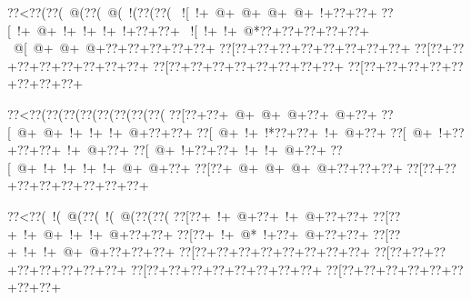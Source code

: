 \vbox{\vbox{\goo
\hbox{\0??<\0??(\0??(\- @(\0??(\- @(\- !(\0??(\0??(}
\hbox{\- ![\- !+\- @+\- @+\- @+\- @+\- !+\0??+\0??+}
\hbox{\0??[\- !+\- @+\- !+\- !+\- !+\- !+\0??+\0??+}
\hbox{\- ![\- !+\- !+\- @*\0??+\0??+\0??+\0??+\0??+}
\hbox{\- @[\- @+\- @+\- @+\0??+\0??+\0??+\0??+\0??+}
\hbox{\0??[\0??+\0??+\0??+\0??+\0??+\0??+\0??+\0??+}
\hbox{\0??[\0??+\0??+\0??+\0??+\0??+\0??+\0??+\0??+}
\hbox{\0??[\0??+\0??+\0??+\0??+\0??+\0??+\0??+\0??+}
\hbox{\0??[\0??+\0??+\0??+\0??+\0??+\0??+\0??+\0??+}
\smallskip
}
}
\hfil\break


\vbox{\vbox{\goo
\hbox{\0??<\0??(\0??(\0??(\0??(\0??(\0??(\0??(\0??(}
\hbox{\0??[\0??+\0??+\- @+\- @+\- @+\0??+\- @+\0??+}
\hbox{\0??[\- @+\- @+\- !+\- !+\- !+\- @+\0??+\0??+}
\hbox{\0??[\- @+\- !+\- !*\0??+\0??+\- !+\- @+\0??+}
\hbox{\0??[\- @+\- !+\0??+\0??+\0??+\- !+\- @+\0??+}
\hbox{\0??[\- @+\- !+\0??+\0??+\- !+\- !+\- @+\0??+}
\hbox{\0??[\- @+\- !+\- !+\- !+\- !+\- @+\- @+\0??+}
\hbox{\0??[\0??+\- @+\- @+\- @+\- @+\0??+\0??+\0??+}
\hbox{\0??[\0??+\0??+\0??+\0??+\0??+\0??+\0??+\0??+}
\smallskip
}
}
\hfil\break


\vbox{\vbox{\goo
\hbox{\0??<\0??(\- !(\- @(\0??(\- !(\- @(\0??(\0??(}
\hbox{\0??[\0??+\- !+\- @+\0??+\- !+\- @+\0??+\0??+}
\hbox{\0??[\0??+\- !+\- @+\- !+\- !+\- @+\0??+\0??+}
\hbox{\0??[\0??+\- !+\- @*\- !+\0??+\- @+\0??+\0??+}
\hbox{\0??[\0??+\- !+\- !+\- @+\- @+\0??+\0??+\0??+}
\hbox{\0??[\0??+\0??+\0??+\0??+\0??+\0??+\0??+\0??+}
\hbox{\0??[\0??+\0??+\0??+\0??+\0??+\0??+\0??+\0??+}
\hbox{\0??[\0??+\0??+\0??+\0??+\0??+\0??+\0??+\0??+}
\hbox{\0??[\0??+\0??+\0??+\0??+\0??+\0??+\0??+\0??+}
\smallskip
}
}
\hfil\break


\bye
